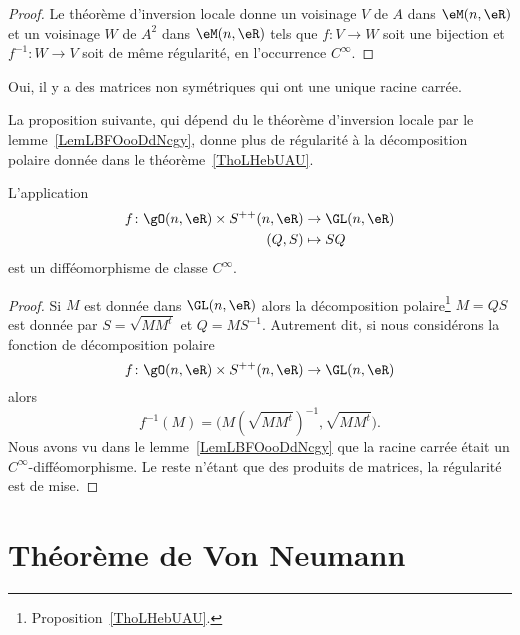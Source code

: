 \begin{proof}
    Le théorème d'inversion locale donne un voisinage \( V\) de $A$ dans \( \eM(n,\eR)\) et un voisinage \( W\) de \( A^2\) dans \( \eM(n,\eR)\) tels que \( f\colon V\to W\) soit une bijection  et \( f^{-1}\colon W\to V\) soit de même régularité, en l'occurrence \( C^{\infty}\).
\end{proof}

\begin{remark}
    Oui, il y a des matrices non symétriques qui ont une unique racine carrée.
\end{remark}

La proposition suivante, qui dépend du le théorème d'inversion locale par le lemme~\ref{LemLBFOooDdNcgy}, donne plus de régularité à la décomposition polaire donnée dans le théorème~\ref{ThoLHebUAU}.
\begin{proposition}       \label{PropWCXAooDuFMjn}
    L'application
    \begin{equation}
        \begin{aligned}
            f\colon \gO(n,\eR)\times S^{++}(n,\eR)&\to \GL(n,\eR) \\
            (Q,S)&\mapsto SQ
        \end{aligned}
    \end{equation}
    est un difféomorphisme de classe \( C^{\infty}\).
\end{proposition}

\begin{proof}
    Si \( M\) est donnée dans \( \GL(n,\eR)\) alors la décomposition polaire\footnote{Proposition~\ref{ThoLHebUAU}.} \( M=QS\) est donnée par \( S=\sqrt{MM^t}\) et \( Q=MS^{-1}\). Autrement dit, si nous considérons la fonction de décomposition polaire
    \begin{equation}
        f\colon \gO(n,\eR)\times S^{++}(n,\eR)\to \GL(n,\eR)
    \end{equation}
    alors
    \begin{equation}
        f^{-1}(M)=\big(  M(\sqrt{MM^t})^{-1},\sqrt{MM^t}  \big).
    \end{equation}
    Nous avons vu dans le lemme~\ref{LemLBFOooDdNcgy} que la racine carrée était un \( C^{\infty}\)-difféomorphisme. Le reste n'étant que des produits de matrices, la régularité est de mise.
\end{proof}

\section{Théorème de Von Neumann}

